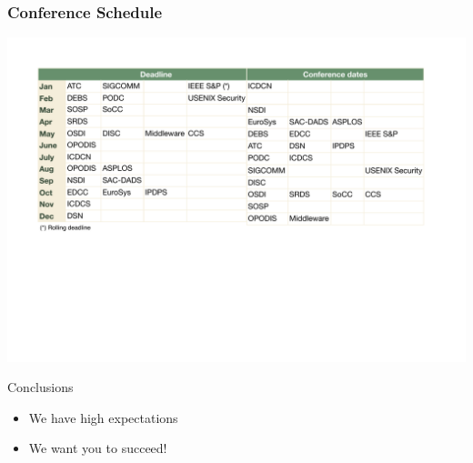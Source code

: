 \documentclass[hyperref={pdfpagelabels=false}, aspectratio=1610]{beamer}
\begin{document}
\begin{frame}
\frametitle{Conference Schedule}
 \includegraphics[scale=0.48]{fig/ConferenceSchedule}
\end{frame}

\begin{frame}
\begin{block}{Conclusions}
 \begin{itemize}
  \item We have high expectations
  \item We want you to succeed!
 \end{itemize}
\end{block}
\end{frame}
\end{document}
